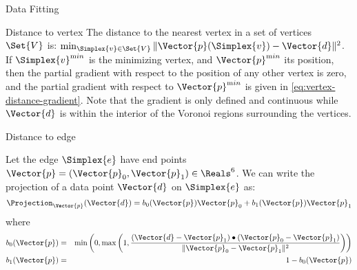 \begin{plSection}{Data Fitting}
\begin{plSection}{Distance to vertex}
The distance to the nearest vertex in a set of vertices $\Set{V}$ is:
$\min_{\Simplex{v} \in \Set{V}} 
\|\Vector{p}(\Simplex{v})-\Vector{d}\|^2$.
If $\Simplex{v}^{\mathrm min}$ is the minimizing vertex,
and
$\Vector{p}^{\mathrm min}$ its position,
then the partial gradient with respect
to the position of any other vertex is zero,
and the partial gradient with respect to $\Vector{p}^{\mathrm min}$
is given in \cref{eq:vertex-distance-gradient}.
Note that the gradient is only defined and continuous
while $\Vector{d}$ is within the interior of the
Voronoi regions surrounding the vertices.

\end{plSection}%
\begin{plSection}{Distance to edge}
\label{sec:Distance-to-edge}

Let the edge $\Simplex{e}$ have end points 
$\Vector{p} = (\Vector{p}_0, \Vector{p}_1) \in \Reals^6$.
We can write the projection of a data point 
$\Vector{d}$ on $\Simplex{e}$ as:
\begin{equation}
\Projection_{\Vector{p}} (\Vector{d}) 
= b_0(\Vector{p}) \Vector{p}_0 + b_1(\Vector{p}) \Vector{p}_1
\end{equation}
where
\begin{eqnarray}
b_0(\Vector{p}) & = &
\min\left(0,\max\left(1,
\frac{ (\Vector{d}-\Vector{p}_1) \bullet (\Vector{p}_0-\Vector{p}_1) }
{\|\Vector{p}_0-\Vector{p}_1\|^2 }
\right) \right) \\
b_1(\Vector{p}) & = & 1-b_0(\Vector{p})
\nonumber
\end{eqnarray}


\end{plSection}
\end{plSection}
